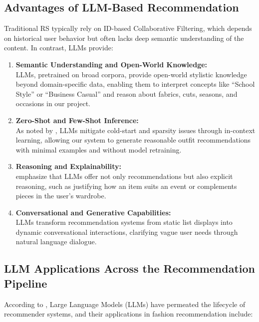 \subsection{Advantages of LLM-Based Recommendation}
Traditional RS typically rely on ID-based Collaborative Filtering, which depends on historical user behavior but often lacks deep semantic understanding of the content. In contrast, LLMs provide:
\begin{enumerate}[label=(\alph*)]
    \item \textbf{Semantic Understanding and Open-World Knowledge:}\\
    LLMs, pretrained on broad corpora, provide open-world stylistic knowledge beyond domain-specific data, enabling them to interpret concepts like “School Style” or “Business Casual” and reason about fabrics, cuts, seasons, and occasions in our project.
    \item \textbf{Zero-Shot and Few-Shot Inference:}\\
    As noted by \cite{wu2023survey}, LLMs mitigate cold-start and sparsity issues through in-context learning, allowing our system to generate reasonable outfit recommendations with minimal examples and without model retraining.
    \item \textbf{Reasoning and Explainability:}\\
    \cite{lin2023benefit} emphasize that LLMs offer not only recommendations but also explicit reasoning, such as justifying how an item suits an event or complements pieces in the user’s wardrobe.
    \item \textbf{Conversational and Generative Capabilities:}\\
    LLMs transform recommendation systems from static list displays into dynamic conversational interactions, clarifying vague user needs through natural language dialogue.
\end{enumerate}



\subsection{LLM Applications Across the Recommendation Pipeline}
According to \cite{lin2023benefit}, Large Language Models (LLMs) have permeated the lifecycle of recommender systems, and their applications in fashion recommendation include:


